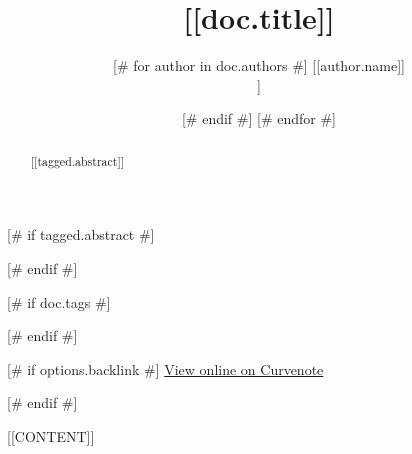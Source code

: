 \documentclass{article}
\title{[[doc.title]]}
\date{\displaydate{articleDate}}
[# else #]
\date{}
[# endif #]
\author{[# for author in doc.authors #]
[[author.name]]\\
[[author.affiliation]]\\
[# if not loop.last #]
\and
[# endif #]
[# endfor #]
}
\begin{document}
\maketitle

[# if tagged.abstract #]
\begin{abstract}
  [[tagged.abstract]]
\end{abstract}

[# endif #]


[# if doc.tags #]

[# endif #]

[# if options.backlink #]
\footnotesize
\href{[[doc.oxalink]]}{View online on Curvenote}

\normalsize
[# endif #]

[[CONTENT]]




\end{document}
